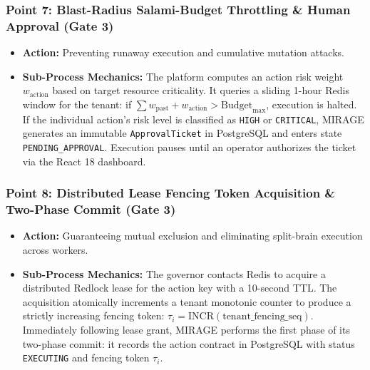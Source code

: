 \documentclass[11pt,a4paper]{article}
\begin{document}
\subsubsection*{Point 7: Blast-Radius Salami-Budget Throttling \& Human Approval (Gate 3)}
\begin{itemize}[leftmargin=*,itemsep=1pt]
  \item \textbf{Action:} Preventing runaway execution and cumulative mutation attacks.
  \item \textbf{Sub-Process Mechanics:} The platform computes an action risk weight $w_{\text{action}}$ based on target resource criticality. It queries a sliding 1-hour Redis window for the tenant: if $\sum w_{\text{past}} + w_{\text{action}} > \text{Budget}_{\text{max}}$, execution is halted. If the individual action's risk level is classified as \texttt{HIGH} or \texttt{CRITICAL}, MIRAGE generates an immutable \texttt{ApprovalTicket} in PostgreSQL and enters state \texttt{PENDING\_APPROVAL}. Execution pauses until an operator authorizes the ticket via the React 18 dashboard.
\end{itemize}

\subsubsection*{Point 8: Distributed Lease Fencing Token Acquisition \& Two-Phase Commit (Gate 3)}
\begin{itemize}[leftmargin=*,itemsep=1pt]
  \item \textbf{Action:} Guaranteeing mutual exclusion and eliminating split-brain execution across workers.
  \item \textbf{Sub-Process Mechanics:} The governor contacts Redis to acquire a distributed Redlock lease for the action key with a 10-second TTL. The acquisition atomically increments a tenant monotonic counter to produce a strictly increasing fencing token: $\tau_{i} = \text{INCR}(\text{tenant\_fencing\_seq})$. Immediately following lease grant, MIRAGE performs the first phase of its two-phase commit: it records the action contract in PostgreSQL with status \texttt{EXECUTING} and fencing token $\tau_i$.
\end{itemize}
\end{document}
